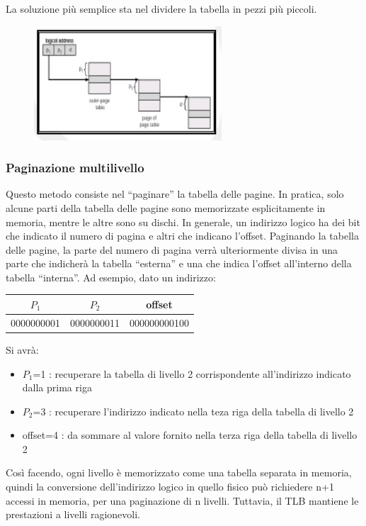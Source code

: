 \documentclass[a4paper]{article}
\begin{document}
La soluzione più semplice sta nel dividere la tabella in pezzi più piccoli.

\begin{figure}
    \includegraphics[width=7cm]{img/pagpag.JPG}
\end{figure}
\subsubsection{Paginazione multilivello}
Questo metodo consiste nel ``paginare'' la tabella delle pagine. In pratica, solo alcune parti della tabella delle pagine sono memorizzate esplicitamente in memoria, mentre le altre sono su dischi. In generale, un indirizzo logico ha dei bit che indicato il numero di pagina e altri che indicano l'offset. Paginando la tabella delle pagine, la parte del numero di pagina verrà ulteriormente divisa in una parte che indicherà la tabella ``esterna'' e una che indica l'offset all'interno della tabella ``interna''.
Ad esempio, dato un indirizzo: \newline
\begin{table}[h!]
    \centering
    \begin{tabular}{ccc}
        $P_1$                            & $P_2$                           & offset                            \\ \hline
        \multicolumn{1}{|c|}{0000000001} & \multicolumn{1}{c|}{0000000011} & \multicolumn{1}{c|}{000000000100} \\ \hline
    \end{tabular}
\end{table} \newline
Si avrà:
\begin{itemize}
    \item $P_1$=1 : recuperare la tabella di livello 2 corrispondente all'indirizzo indicato dalla prima riga
    \item $P_2$=3 : recuperare l'indirizzo indicato nella teza riga della tabella di livello 2
    \item offset=4 : da sommare al valore fornito nella terza riga della tabella di livello 2
\end{itemize}
Così facendo, ogni livello è memorizzato come una tabella separata in memoria, quindi la conversione dell'indirizzo logico in quello fisico può richiedere n+1 accessi in memoria, per una paginazione di n livelli. Tuttavia, il TLB mantiene le prestazioni a livelli ragionevoli.
\end{document}
